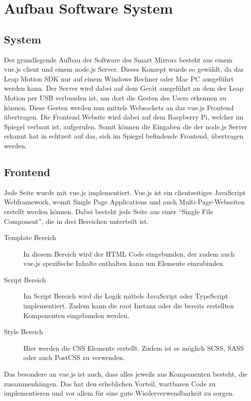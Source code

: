 \documentclass[12pt, a4paper]{scrartcl}
\begin{document}
	\newpage
	\section{Aufbau Software System}
	\subsection{System}
	Der grundlegende Aufbau der Software des Smart Mirrors besteht aus einem vue.js client und einem node.js Server. Dieses Konzept wurde so gewählt, da das Leap Motion SDK nur auf einem Windows Rechner oder Mac PC ausgeführt werden kann. Der Server wird dabei auf dem Gerät ausgeführt an dem der Leap Motion per USB verbunden ist, um dort die Gesten des Users erkennen zu können. Diese Gesten werden nun mittels Websockets an das vue.js Frontend übertragen. Die Frontend Website wird dabei auf dem Raspberry Pi, welcher im Spiegel verbaut ist, aufgerufen. Somit können die Eingaben die der node.js Server erkannt hat in echtzeit auf das, sich im Spiegel befindende Frontend, übertragen werden.
	\subsection{Frontend}
	Jede Seite wurde mit vue.js implementiert. Vue.js ist ein clientseitiges JavaScript Webframework, womit Single Page Applications und auch Multi-Page-Webseiten erstellt werden können. Dabei besteht jede Seite aus einer “Single File Component”, die in drei Bereichen unterteilt ist. 
	\begin{description}
		\item[Template Bereich] In diesem Bereich wird der HTML Code eingebunden, der zudem auch vue.js spezifische Inhalte enthalten kann um Elemente einzubinden.
		\item[Script Bereich] Im Script Bereich wird die Logik mittels JavaScript oder TypeScript
		implementiert. Zudem kann die root Instanz oder die bereits erstellten
		Komponenten eingebunden werden.
		\item[Style Bereich] Hier werden die CSS Elemente erstellt. Zudem ist es möglich SCSS, SASS
		oder auch PostCSS zu verwenden.
	\end{description}
	Das besondere an vue.js ist auch, dass alles jeweils aus Komponenten besteht, die zusammenhängen. Das hat den erheblichen Vorteil, wartbaren Code zu implementieren und vor allem für eine gute Wiederverwendbarkeit zu sorgen. 
\end{document}

